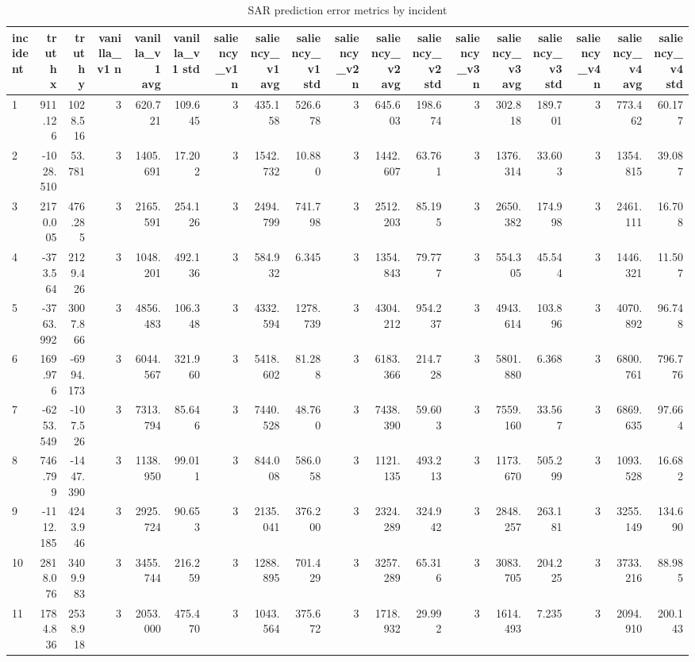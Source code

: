\begin{table}[ht]
\centering
\caption{SAR prediction error metrics by incident}
\label{tab:sar-incident-errors}
\begin{tabular}{lrrrrrrrrrrrrrrrrr}
\hline
incident & truth x & truth y & vanilla\_v1 n & vanilla\_v1 avg & vanilla\_v1 std & saliency\_v1 n & saliency\_v1 avg & saliency\_v1 std & saliency\_v2 n & saliency\_v2 avg & saliency\_v2 std & saliency\_v3 n & saliency\_v3 avg & saliency\_v3 std & saliency\_v4 n & saliency\_v4 avg & saliency\_v4 std \\
\hline
1 & 911.126 & 1028.516 & 3 & 620.721 & 109.645 & 3 & 435.158 & 526.678 & 3 & 645.603 & 198.674 & 3 & 302.818 & 189.701 & 3 & 773.462 & 60.177 \\
2 & -1028.510 & 53.781 & 3 & 1405.691 & 17.202 & 3 & 1542.732 & 10.880 & 3 & 1442.607 & 63.761 & 3 & 1376.314 & 33.603 & 3 & 1354.815 & 39.087 \\
3 & 2170.005 & 476.285 & 3 & 2165.591 & 254.126 & 3 & 2494.799 & 741.798 & 3 & 2512.203 & 85.195 & 3 & 2650.382 & 174.998 & 3 & 2461.111 & 16.708 \\
4 & -373.564 & 2129.426 & 3 & 1048.201 & 492.136 & 3 & 584.932 & 6.345 & 3 & 1354.843 & 79.777 & 3 & 554.305 & 45.544 & 3 & 1446.321 & 11.507 \\
5 & -3763.992 & 3007.866 & 3 & 4856.483 & 106.348 & 3 & 4332.594 & 1278.739 & 3 & 4304.212 & 954.237 & 3 & 4943.614 & 103.896 & 3 & 4070.892 & 96.748 \\
6 & 169.976 & -6994.173 & 3 & 6044.567 & 321.960 & 3 & 5418.602 & 81.288 & 3 & 6183.366 & 214.728 & 3 & 5801.880 & 6.368 & 3 & 6800.761 & 796.776 \\
7 & -6253.549 & -107.526 & 3 & 7313.794 & 85.646 & 3 & 7440.528 & 48.760 & 3 & 7438.390 & 59.603 & 3 & 7559.160 & 33.567 & 3 & 6869.635 & 97.664 \\
8 & 746.799 & -1447.390 & 3 & 1138.950 & 99.011 & 3 & 844.008 & 586.058 & 3 & 1121.135 & 493.213 & 3 & 1173.670 & 505.299 & 3 & 1093.528 & 16.682 \\
9 & -1112.185 & 4243.946 & 3 & 2925.724 & 90.653 & 3 & 2135.041 & 376.200 & 3 & 2324.289 & 324.942 & 3 & 2848.257 & 263.181 & 3 & 3255.149 & 134.690 \\
10 & 2818.076 & 3409.983 & 3 & 3455.744 & 216.259 & 3 & 1288.895 & 701.429 & 3 & 3257.289 & 65.316 & 3 & 3083.705 & 204.225 & 3 & 3733.216 & 88.985 \\
11 & 1784.836 & 2538.918 & 3 & 2053.000 & 475.470 & 3 & 1043.564 & 375.672 & 3 & 1718.932 & 29.992 & 3 & 1614.493 & 7.235 & 3 & 2094.910 & 200.143 \\

\end{tabular}
\end{table}
